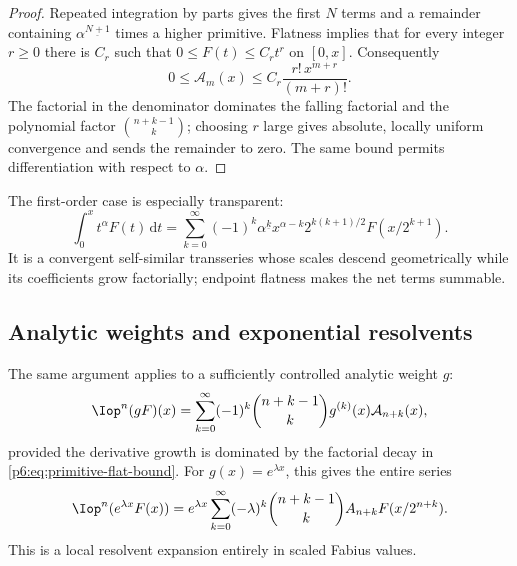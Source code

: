 \documentclass[11pt,oneside]{article}
\theoremstyle{definition}
\theoremstyle{remark}
\newcommand{\dd}{\,\mathrm d}
\newcommand{\fall}[2]{#1^{\underline{#2}}}
\newcommand{\1}{\mathbf 1}
\begin{document}
\begin{proof}
Repeated integration by parts gives the first \(N\) terms and a remainder containing
\(\fall{\alpha}{N+1}\) times a higher primitive.  Flatness implies that for every
integer \(r\ge0\) there is \(C_r\) such that \(0\le F(t)\le C_rt^r\) on \([0,x]\).
Consequently
\begin{equation}
 0\le\mathcal A_m(x)
 \le C_r\frac{r!\,x^{m+r}}{(m+r)!}.                       \label{p6:eq:primitive-flat-bound}
\end{equation}
The factorial in the denominator dominates the falling factorial and the polynomial
factor \(\binom{n+k-1}{k}\); choosing \(r\) large gives absolute, locally uniform
convergence and sends the remainder to zero.  The same bound permits differentiation
with respect to \(\alpha\).
\end{proof}

The first-order case is especially transparent:
\begin{equation}
 \int_0^xt^\alpha F(t)\dd t
 =\sum_{k=0}^{\infty}(-1)^k\fall{\alpha}{k}
   x^{\alpha-k}2^{k(k+1)/2}F(x/2^{k+1}).                  \label{p6:eq:complex-first-primitive}
\end{equation}
It is a convergent self-similar transseries whose scales descend geometrically while its
coefficients grow factorially; endpoint flatness makes the net terms summable.

\subsection{Analytic weights and exponential resolvents}

The same argument applies to a sufficiently controlled analytic weight \(g\):
\begin{equation}
 \Iop^n(gF)(x)
 =\sum_{k=0}^{\infty}(-1)^k\binom{n+k-1}{k}
   g^{(k)}(x)\mathcal A_{n+k}(x),                          \label{p6:eq:analytic-weight}
\end{equation}
provided the derivative growth is dominated by the factorial decay in
\eqref{p6:eq:primitive-flat-bound}.  For \(g(x)=e^{\lambda x}\), this gives the entire
series
\begin{equation}
 \Iop^n(e^{\lambda x}F(x))
 =e^{\lambda x}\sum_{k=0}^{\infty}(-\lambda)^k
   \binom{n+k-1}{k}A_{n+k}F(x/2^{n+k}).                   \label{p6:eq:exponential-weight}
\end{equation}
This is a local resolvent expansion entirely in scaled Fabius values.
\end{document}

